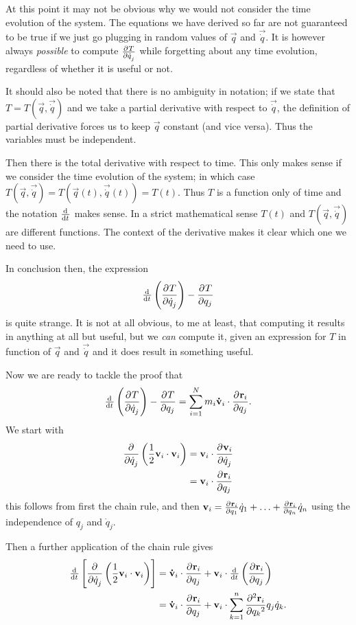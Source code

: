 At this point it may not be obvious why we would not consider the time evolution of the system. The equations we have derived so far are not guaranteed to be true if we just go plugging in random values of $\vec{q}$ and $\vec{\dot{q}}$. It is however always \textit{possible} to compute $ \frac{\partial{^{}}T}{\partial{{\dot{q}_j}^{}}} $ while forgetting about any time evolution, regardless of whether it is useful or not.

It should also be noted that there is no ambiguity in notation; if we state that $T = T(\vec{q}, \vec{\dot{q}})$ and we take a partial derivative with respect to $\vec{\dot{q}}$, the definition of partial derivative forces us to keep $\vec{q}$ constant (and vice versa). Thus the variables must be independent.

Then there is the total derivative with respect to time. This only makes sense if we consider the time evolution of the system; in which case $T(\vec{q}, \vec{\dot{q}}) = T(\vec{q}(t), \vec{\dot{q}}(t)) = T(t)$. Thus $T$ is a function only of time and the notation $\od{}{t}$ makes sense. In a strict mathematical sense $T(t)$ and $T(\vec{q}, \vec{\dot{q}})$ are different functions. The context of the derivative makes it clear which one we need to use.

In conclusion then, the expression
\[ \od{}{t}\left(\pd{T}{\dot{q}_j}\right) - \pd{T}{q_j} \]
is quite strange. It is not at all obvious, to me at least, that computing it results in anything at all but useful, but we \textit{can} compute it, given an expression for $T$ in function of $\vec{q}$ and $\vec{\dot{q}}$ and it does result in something useful.

Now we are ready to tackle the proof that 
\[ \od{}{t}\left(\pd{T}{\dot{q}_j}\right) - \pd{T}{q_j} = \sum^N_{i=1}m_i \vec{\dot{v}}_i \cdot \pd{\vec{r}_i}{q_j}. \]
We start with
\begin{align*}
 \frac{\partial{^{}}}{\partial{{\dot{q}_j}^{}}} \left(\frac{1}{2}\bm{\mathrm{v}}_i\cdot \bm{\mathrm{v}}_i\right) &= \bm{\mathrm{v}}_i \cdot  \frac{\partial{^{}}\bm{\mathrm{v}}_i}{\partial{{\dot{q}_j}^{}}}  \\
&= \bm{\mathrm{v}}_i \cdot  \frac{\partial{^{}}\bm{\mathrm{r}}_i}{\partial{{q_j}^{}}} 
\end{align*}
this follows from first the chain rule, and then $\bm{\mathrm{v}}_i =  \frac{\partial{^{}}\bm{\mathrm{r}}_i}{\partial{{q_1}^{}}} \dot{q}_1 + \ldots +  \frac{\partial{^{}}\bm{\mathrm{r}}_i}{\partial{{q_n}^{}}} \dot{q}_n$ using the independence of $q_j$ and $\dot{q}_j$.

Then a further application of the chain rule gives 
\begin{align*}
\od{}{t}\left[\pd{}{\dot{q}_j}\left(\frac{1}{2}\vec{v}_i\cdot \vec{v}_i\right)\right] &= \vec{\dot{v}}_i \cdot \pd{\vec{r}_i}{q_j} + \vec{v}_i \cdot \od{}{t}\left(\pd{\vec{r}_i}{q_j}\right) \\
&= \vec{\dot{v}}_i \cdot \pd{\vec{r}_i}{q_j} + \vec{v}_i\cdot \sum^n_{k=1}\pd[2]{\vec{r}_i}{q_k}{q_j}\dot{q}_k.
\end{align*}

